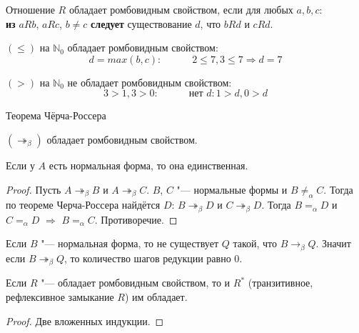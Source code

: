 \documentclass[aspectratio=169]{beamer}
\begin{document}
\begin{frame}{}
\begin{dfn}
	Отношение $R$ обладает ромбовидным свойством, если для любых $a,b,c$:\\
{\bf из} $aRb$, $aRc$, $b\neq{}c$ {\bf следует} существование $d$, что $bRd$ и $cRd$.
\end{dfn}

\begin{exm}
	$(\leq)$ на $\mathbb{N}_0$ обладает ромбовидным свойством: $$d = max(b,c):\quad\quad\quad 2 \leq 7, 3 \leq 7 \Rightarrow d = 7$$

	$(>)$ на $\mathbb{N}_0$ не обладает ромбовидным свойством: $$3 > 1, 3 > 0:\quad\quad\quad \text{нет } d: 1 > d, 0 > d$$
\end{exm}
\end{frame}

\begin{frame}{Теорема Чёрча-Россера}
\begin{thm}
	$(\twoheadrightarrow_{\beta})$ обладает ромбовидным свойством.
\end{thm}


\begin{cons}
	Если у $A$ есть нормальная форма, то она единственная.
\end{cons}

\begin{proof}
	Пусть $A\twoheadrightarrow_{\beta}B$ и $A\twoheadrightarrow_{\beta}C$. $B$, $C$ "--- нормальные формы и $B\neq_{\alpha}C$. 
	Тогда по теореме Черча-Россера найдётся $D$: $B\twoheadrightarrow_{\beta}D$ и $C\twoheadrightarrow_{\beta}D$. Тогда $B=_{\alpha}D$ и $C=_{\alpha} D$ $\Rightarrow$ $B=_{\alpha}C$. Противоречие.
\end{proof}

\begin{lmm}
	Если $B$ "--- нормальная форма, то не существует $Q$ такой, что $B\to_{\beta}Q$. Значит если $B\twoheadrightarrow_{\beta}Q$, то количество шагов редукции равно 0.
\end{lmm}
\end{frame}

\begin{frame}{}
\begin{lmm}
	 \label{refl}
	Если $R$ "--- обладает ромбовидным свойством, то и $R^{*}$ (транзитивное, рефлексивное замыкание $R$) им обладает.
\end{lmm}

\begin{proof}
Две вложенных индукции.
\end{proof}
\end{frame}
\end{document}
